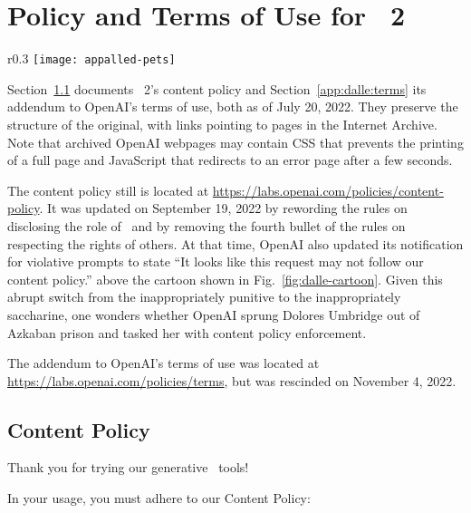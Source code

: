 \section{Policy and Terms of Use for \DDAALLEE\ 2}
\label{app:dalle-sources}

\begin{wrapfigure}[9]{r}{0.3\textwidth}
\centering
\texttt{[image: appalled-pets]}
\caption{Be nice to \DALLE's pets!}\label{fig:dalle-cartoon}
\end{wrapfigure}

Section~\ref{app:dalle-content-policy} documents \DALLE~2's content policy and
Section~\ref{app:dalle:terms} its addendum to OpenAI's terms of use, both as of
July 20, 2022. They preserve the structure of the original, with links pointing
to pages in the Internet Archive. Note that archived OpenAI webpages may contain
CSS that prevents the printing of a full page and JavaScript that redirects to
an error page after a few seconds.

The content policy still is located at
\url{https://labs.openai.com/policies/content-policy}. It was updated on
September 19, 2022 by rewording the rules on disclosing the role of \AI\ and by
removing the fourth bullet of the rules on respecting the rights of others. At
that time, OpenAI also updated its notification for violative prompts to state
``It looks like this request may not follow our content policy.'' above the
cartoon shown in Fig.~\ref{fig:dalle-cartoon}. Given this abrupt switch from the
inappropriately punitive to the inappropriately saccharine, one wonders whether
OpenAI sprung Dolores Umbridge out of Azkaban prison and tasked her with content
policy enforcement.

The addendum to OpenAI's terms of use was located at
\url{https://labs.openai.com/policies/terms}, but was rescinded on November 4,
2022.


\subsection{Content Policy}
\label{app:dalle-content-policy}

Thank you for trying our generative \AI\ tools!

\noindent In your usage, you must adhere to our Content Policy:

